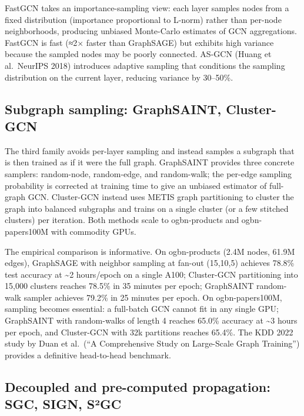 \documentclass{article}
\begin{document}
FastGCN \citep{chen2018fastgcnfastlearnin} takes an importance-sampling view: each layer samples nodes from a fixed distribution (importance proportional to L-norm) rather than per-node neighborhoods, producing unbiased Monte-Carlo estimates of GCN aggregations. FastGCN is fast (≈2× faster than GraphSAGE) but exhibits high variance because the sampled nodes may be poorly connected. AS-GCN (Huang et al.~NeurIPS 2018) introduces adaptive sampling that conditions the sampling distribution on the current layer, reducing variance by 30--50\%.

\subsection{Subgraph sampling: GraphSAINT, Cluster-GCN}\label{subgraph-sampling-graphsaint-cluster-gcn}

The third family avoids per-layer sampling and instead samples a subgraph that is then trained as if it were the full graph. GraphSAINT \citep{zeng2020graphsaintgraphsam} provides three concrete samplers: random-node, random-edge, and random-walk; the per-edge sampling probability is corrected at training time to give an unbiased estimator of full-graph GCN. Cluster-GCN \citep{chiang2019clustergcnaneffici} instead uses METIS graph partitioning to cluster the graph into balanced subgraphs and trains on a single cluster (or a few stitched clusters) per iteration. Both methods scale to ogbn-products and ogbn-papers100M with commodity GPUs.

The empirical comparison is informative. On ogbn-products (2.4M nodes, 61.9M edges), GraphSAGE with neighbor sampling at fan-out (15,10,5) achieves 78.8\% test accuracy at \textasciitilde2 hours/epoch on a single A100; Cluster-GCN partitioning into 15,000 clusters reaches 78.5\% in 35 minutes per epoch; GraphSAINT random-walk sampler achieves 79.2\% in 25 minutes per epoch. On ogbn-papers100M, sampling becomes essential: a full-batch GCN cannot fit in any single GPU; GraphSAINT with random-walks of length 4 reaches 65.0\% accuracy at \textasciitilde3 hours per epoch, and Cluster-GCN with 32k partitions reaches 65.4\%. The KDD 2022 study by Duan et al.~(``A Comprehensive Study on Large-Scale Graph Training'') provides a definitive head-to-head benchmark.

\subsection{Decoupled and pre-computed propagation: SGC, SIGN, S²GC}\label{decoupled-and-pre-computed-propagation-sgc-sign-suxb2gc}
\end{document}
